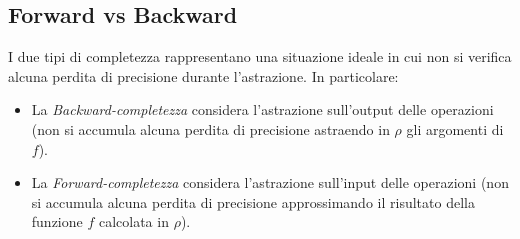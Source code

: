 \documentclass[a4paper,oneside,titlepage]{book}
\begin{document}
\subsection{Forward vs Backward}
I due tipi di completezza rappresentano una situazione ideale in cui non si verifica alcuna perdita di precisione durante l'astrazione. In particolare:
\begin{itemize}
	\item La \textit{Backward-completezza} considera l'astrazione sull'output delle operazioni (non si accumula alcuna perdita di precisione astraendo in $\rho$ gli argomenti di $f$).
	\item La \textit{Forward-completezza} considera l'astrazione sull'input delle operazioni (non si accumula alcuna perdita di precisione approssimando il risultato della funzione $f$ calcolata in $\rho$).
\end{itemize}
\end{document}
